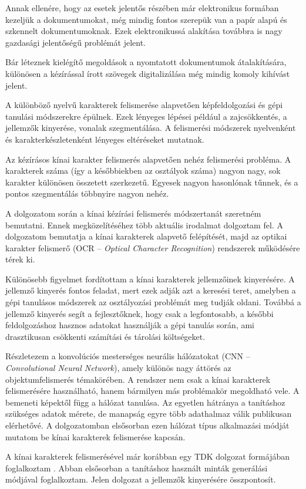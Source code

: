 
Annak ellenére, hogy az esetek jelentős részében már elektronikus formában kezeljük a dokumentumokat, még mindig fontos szerepük van a papír alapú és szkennelt dokumentumoknak. Ezek elektronikussá alakítása továbbra is nagy gazdasági jelentőségű problémát jelent.

Bár léteznek kielégítő megoldások a nyomtatott dokumentumok átalakítására, különösen a kézírással írott szövegek digitalizálása még mindig komoly kihívást jelent.

A különböző nyelvű karakterek felismerése alapvetően képfeldolgozási és gépi tanulási módszerekre épülnek. Ezek lényeges lépései például a zajcsökkentés, a jellemzők kinyerése, vonalak szegmentálása. A felismerési módszerek nyelvenként és karakterkészletenként lényeges eltéréseket mutatnak.

Az kézírásos kínai karakter felismerés alapvetően nehéz felismerési probléma. A karakterek száma (így a későbbiekben az osztályok száma) nagyon nagy, sok karakter különösen összetett szerkezetű. Egyesek nagyon hasonlónak tűnnek, és a pontos szegmentálás többnyire nagyon nehéz.

A dolgozatom során a kínai kézírási felismerés módszertanát szeretném bemutatni. Ennek megközelítéséhez több aktuális irodalmat dolgoztam fel. A dolgozatom bemutatja a kínai karakterek alapvető felépítését, majd az optikai karakter felismerő (OCR -- \textit{Optical Character Recognition}) rendszerek működésére térek ki.

Különösebb figyelmet fordítottam a kínai karakterek jellemzőinek kinyerésére. A jellemző kinyerés fontos feladat, mert ezek adják azt a keresési teret, amelyben a gépi tanulásos módszerek az osztályozási problémát meg tudják oldani. Továbbá a jellemző kinyerés segít a fejlesztőknek, hogy csak a legfontosabb, a későbbi feldolgozáshoz hasznos adatokat használják a gépi tanulás során, ami drasztikusan csökkenti számítási és tárolási költségeket.

Részletezem a konvolúciós mesterséges neurális hálózatokat (CNN -- \textit{Convolutional Neural Network}), amely különös nagy áttörés az objektumfelismerés témakörében. A rendszer nem csak a kínai karakterek felismerésére használható, hanem bármilyen más problémakör megoldható vele. A bemeneti képektől függ a hálózat tanulása. Az egyetlen hátránya a tanításhoz szükséges adatok mérete, de manapság egyre több adathalmaz válik publikusan elérhetővé. A dolgozatomban elsősorban ezen hálózat típus alkalmazási módját mutatom be kínai karakterek felismerése kapcsán.

A kínai karakterek felismerésével már korábban egy TDK dolgozat formájában foglalkoztam \cite{tdk}. Abban elsősorban a tanításhoz használt minták generálási módjával foglalkoztam. Jelen dolgozat a jellemzők kinyerésére összpontosít.
